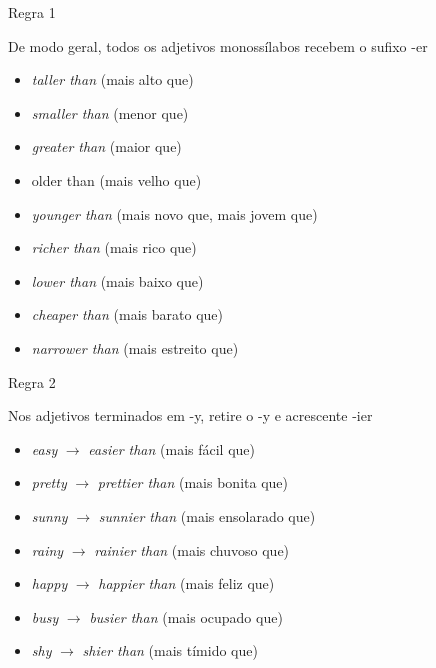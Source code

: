 \documentclass[compress,mathserif]{beamer}
\begin{document}
\begin{frame}{Regra 1}

De modo geral, todos os adjetivos monossílabos recebem o sufixo -er

\vspace{0.5cm}

\begin{itemize}
    \item \textit{taller than} (mais alto que)
    \item \textit{smaller than} (menor que)
    \item \textit{greater than} (maior que)
    \item older than (mais velho que)
    \item \textit{younger than} (mais novo que, mais jovem que)
    \item \textit{richer than} (mais rico que)
    \item \textit{lower than} (mais baixo que)
    \item \textit{cheaper than} (mais barato que)
    \item \textit{narrower than} (mais estreito que)
\end{itemize}

\end{frame}


\begin{frame}{Regra 2}

Nos adjetivos terminados em -y, retire o -y e acrescente -ier

\vspace{0.5cm}

\begin{itemize}
    \item \textit{easy} $\rightarrow$ \textit{easier than} (mais fácil que)
    \item \textit{pretty} $\rightarrow$ \textit{prettier than} (mais bonita que)
    \item \textit{sunny} $\rightarrow$ \textit{sunnier than} (mais ensolarado que)
    \item \textit{rainy} $\rightarrow$ \textit{rainier than} (mais chuvoso que)
    \item \textit{happy} $\rightarrow$ \textit{happier than} (mais feliz que)
    \item \textit{busy} $\rightarrow$ \textit{busier than} (mais ocupado que)
    \item \textit{shy} $\rightarrow$ \textit{shier than} (mais tímido que)
\end{itemize}

\end{frame}
\end{document}
